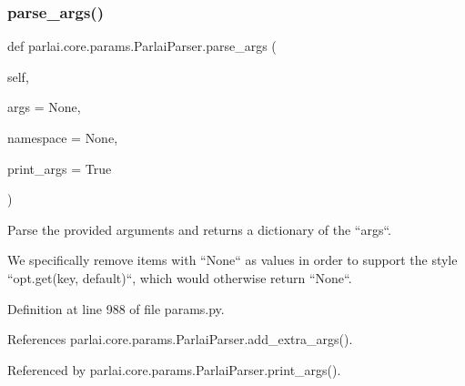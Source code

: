 \subsubsection{\texorpdfstring{parse\+\_\+args()}{parse\_args()}}
{\footnotesize\ttfamily def parlai.\+core.\+params.\+Parlai\+Parser.\+parse\+\_\+args (\begin{DoxyParamCaption}\item[{}]{self,  }\item[{}]{args = {\ttfamily None},  }\item[{}]{namespace = {\ttfamily None},  }\item[{}]{print\+\_\+args = {\ttfamily True} }\end{DoxyParamCaption})}

\begin{DoxyVerb}Parse the provided arguments and returns a dictionary of the ``args``.

We specifically remove items with ``None`` as values in order
to support the style ``opt.get(key, default)``, which would otherwise
return ``None``.
\end{DoxyVerb}
 

Definition at line 988 of file params.\+py.



References parlai.\+core.\+params.\+Parlai\+Parser.\+add\+\_\+extra\+\_\+args().



Referenced by parlai.\+core.\+params.\+Parlai\+Parser.\+print\+\_\+args().

